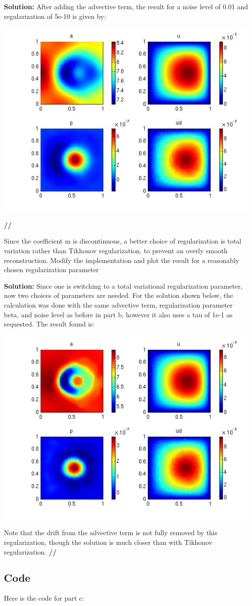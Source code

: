 \documentclass[11pt]{article}
\newenvironment{solution}{\begin{trivlist}\item[]{\bf Solution:}}
                      {\textbf{//} \end{trivlist}}
\begin{document}
\begin{enumerate}
\begin{solution}
After adding the advective term, the result for a noise level of 0.01
 and regularization of 5e-10 is given by: 
\begin{center}
\includegraphics[width = 6 cm]{figs/prob2bNoiseRegM8.jpg}
\end{center}
\end{solution}

\item[(c)] Since the coefficient m is discontinuous, a better choice of
	   regularization is total variation
	   rather than Tikhonov regularization, to prevent an overly smooth
	   reconstruction. Modify the implementation and plot the result
	   for a reasonably chosen regularization parameter



\begin{solution}
 Since one is switching to a total variational regularization parameter,
 now two choices of parameters are needed. For the solution shown below,
 the calculation was done with the same advective term, regularization
 parameter beta, and noise level as before in part b, however it also
 uses a tau of 1e-1 as requested. The result found is: 
\begin{center}
\includegraphics[width = 6 cm]{figs/prob2c.jpg}
\end{center}
Note that the drift from the advective term is not fully removed by this
 regularization, though the solution is much closer than with Tikhonov
 regularization. 
\end{solution}
\end{enumerate}

\newpage
\subsection*{Code}
Here is the code for part c:

\end{document}

